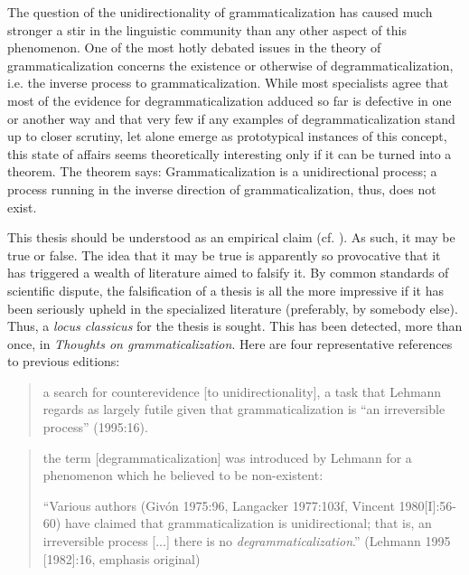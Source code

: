 The question of the unidirectionality of grammaticalization has caused much stronger a stir in the linguistic community than any other aspect of this phenomenon. One of the most hotly debated issues in the theory of grammaticalization concerns the existence or otherwise of degrammaticalization, i.e. the inverse process to grammaticalization. While most specialists agree that most of the evidence for degrammaticalization adduced so far is defective in one or another way and that very few if any examples of degrammaticalization stand up to closer scrutiny, let alone emerge as prototypical instances of this concept, this state of affairs seems theoretically interesting only if it can be turned into a theorem. The theorem says: Grammaticalization is a unidirectional process; a process running in the inverse direction of grammaticalization, thus, does not exist.

This thesis should be understood as an empirical claim (cf. \citealt[§4.2]{Lehmann2004}). As such, it may be true or false. The idea that it may be true is apparently so provocative that it has triggered a wealth of literature aimed to falsify it. By common standards of scientific dispute, the falsification of a thesis is all the more impressive if it has been seriously upheld in the specialized literature (preferably, by somebody else). Thus, a \textit{locus classicus} for the thesis is sought. This has been detected, more than once, in \textit{Thoughts on grammaticalization}. Here are four representative references to previous editions:

\begin{quote}
a search for counterevidence [to unidirectionality], a task that Lehmann regards as largely futile given that grammaticalization is “an irreversible process” (1995:16).

\citep[569]{Howe2010}
\end{quote}

\begin{quote}\enlargethispage{2\baselineskip}
the term [degrammaticalization] was introduced by Lehmann for a phenomenon which he believed to be non-existent:

``Various authors (Givón 1975:96, Langacker 1977:103f, Vincent 1980[I]:56-60) have claimed that grammaticalization is unidirectional; that is, an irreversible process [...] there is no \textit{degrammaticalization}.” (Lehmann 1995 [1982]:16, emphasis original)

\citep[123]{Norde2010}
\end{quote}

